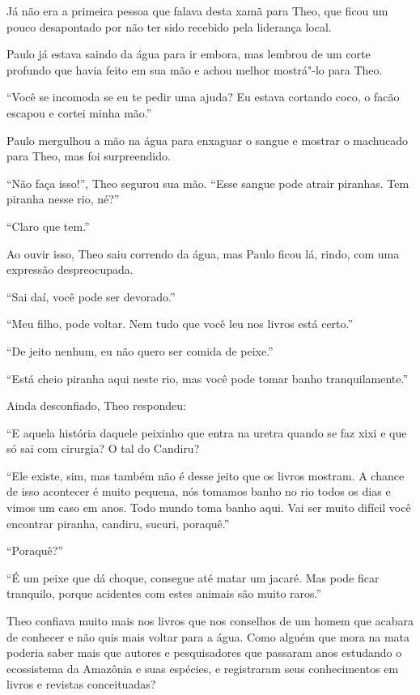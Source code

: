 Já não era a primeira pessoa que falava desta xamã para Theo, que ficou
um pouco desapontado por não ter sido recebido pela liderança local.

Paulo já estava saindo da água para ir embora, mas lembrou de um corte
profundo que havia feito em sua mão e achou melhor mostrá"-lo para Theo.

``Você se incomoda se eu te pedir uma ajuda? Eu estava cortando coco, o
facão escapou e cortei minha mão.''

Paulo mergulhou a mão na água para enxaguar o sangue e mostrar o
machucado para Theo, mas foi surpreendido.

``Não faça isso!'', Theo segurou sua mão. ``Esse sangue pode atrair
piranhas. Tem piranha nesse rio, né?''

``Claro que tem.''

Ao ouvir isso, Theo saiu correndo da água, mas Paulo ficou lá, rindo,
com uma expressão despreocupada.

``Sai daí, você pode ser devorado.''

``Meu filho, pode voltar. Nem tudo que você leu nos livros está certo.''

``De jeito nenhum, eu não quero ser comida de peixe.''

``Está cheio piranha aqui neste rio, mas você pode tomar banho
tranquilamente.''

Ainda desconfiado, Theo respondeu:

``E aquela história daquele peixinho que entra na uretra quando se faz xixi
e que só sai com cirurgia? O tal do Candiru?

``Ele existe, sim, mas também não é desse jeito que os livros mostram. A
chance de isso acontecer é muito pequena, nós tomamos banho no rio todos
os dias e vimos um caso em anos. Todo mundo toma banho aqui. Vai ser
muito difícil você encontrar piranha, candiru, sucuri, poraquê.''

``Poraquê?''

``É um peixe que dá choque, consegue até matar um jacaré. Mas pode ficar
tranquilo, porque acidentes com estes animais são muito raros.''

Theo confiava muito mais nos livros que nos conselhos de um homem que
acabara de conhecer e não quis mais voltar para a água. Como alguém que
mora na mata poderia saber mais que autores e pesquisadores que passaram
anos estudando o ecossistema da Amazônia e suas espécies, e registraram
seus conhecimentos em livros e revistas conceituadas?

